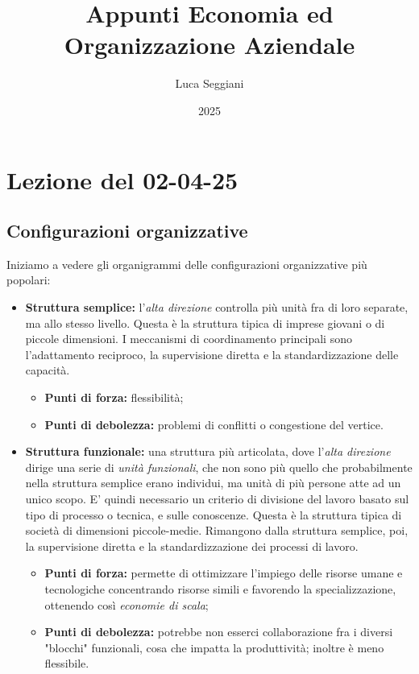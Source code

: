 \documentclass[a4paper,11pt]{article}
\title{Appunti Economia ed Organizzazione Aziendale}
\author{Luca Seggiani}
\date{2025}
\begin{document}
\section{Lezione del 02-04-25}

\thispagestyle{empty}
\pagestyle{fancy}

\subsection{Configurazioni organizzative}
Iniziamo a vedere gli organigrammi delle configurazioni organizzative più popolari:
\begin{itemize}
	\item \textbf{Struttura semplice:} l'\textit{alta direzione} controlla più unità fra di loro separate, ma allo stesso livello.
		Questa è la struttura tipica di imprese giovani o di piccole dimensioni.
		I meccanismi di coordinamento principali sono l'adattamento reciproco, la supervisione diretta e la standardizzazione delle capacità.
		\begin{itemize}
			\item \textbf{Punti di forza:} flessibilità;
			\item \textbf{Punti di debolezza:} problemi di conflitti o congestione del vertice.
		\end{itemize}

	\item \textbf{Struttura funzionale:} una struttura più articolata, dove l'\textit{alta direzione} dirige una serie di \textit{unità funzionali}, che non sono più quello che probabilmente nella struttura semplice erano individui, ma unità di più persone atte ad un unico scopo.
		E' quindi necessario un criterio di divisione del lavoro basato sul tipo di processo o tecnica, e sulle conoscenze.
		Questa è la struttura tipica di società di dimensioni piccole-medie.
		Rimangono dalla struttura semplice, poi, la supervisione diretta e la standardizzazione dei processi di lavoro.
		\begin{itemize}
			\item \textbf{Punti di forza:} permette di ottimizzare l'impiego delle risorse umane e tecnologiche concentrando risorse simili e favorendo la specializzazione, ottenendo così \textit{economie di scala}; 
			\item \textbf{Punti di debolezza:} potrebbe non esserci collaborazione fra i diversi "blocchi" funzionali, cosa che impatta la produttività; inoltre è meno flessibile.
		\end{itemize}
		

\end{itemize}
\end{document}
